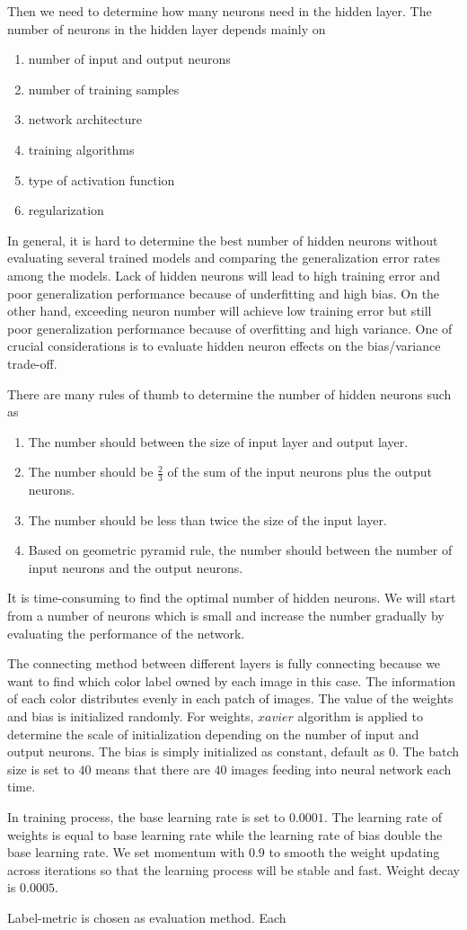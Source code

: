 Then we need to determine how many neurons need in the hidden layer. The number of neurons in the hidden layer depends mainly on
\begin{enumerate}
  \item number of input and output neurons
  \item number of training samples
  \item network architecture
  \item training algorithms
  \item type of activation function
  \item regularization
\end{enumerate}
In general, it is hard to determine the best number of hidden neurons without evaluating several trained models and comparing the generalization error rates among the models. Lack of hidden neurons will lead to high training error and poor generalization performance because of underfitting and high bias. On the other hand, exceeding neuron number will achieve low training error but still poor generalization performance because of overfitting and high variance. One of crucial considerations is to evaluate hidden neuron effects on the bias/variance trade-off.

There are many rules of thumb to determine the number of hidden neurons \citep{heaton2008introduction} such as
\begin{enumerate}
  \item The number should between the size of input layer and output layer.
  \item The number should be $\frac{2}{3}$ of the sum of the input neurons plus the output neurons.
  \item The number should be less than twice the size of the input layer.
  \item Based on geometric pyramid rule, the number should between the number of input neurons and the output neurons.
\end{enumerate}
It is time-consuming to find the optimal number of hidden neurons. We will start from a number of neurons which is small and increase the number gradually by evaluating the performance of the network.

The connecting method between different layers is fully connecting because we want to find which color label owned by each image in this case. The information of each color distributes evenly in each patch of images. The value of the weights and bias is initialized randomly. For weights, $xavier$ algorithm is applied to determine the scale of initialization depending on the number of input and output neurons. The bias is simply initialized as constant, default as $0$. The batch size is set to $40$ means that there are $40$ images feeding into neural network each time.

In training process, the base learning rate is set to $0.0001$. The learning rate of weights is equal to base learning rate while the learning rate of bias double the base learning rate. We set momentum with $0.9$ to smooth the weight updating across iterations so that the learning process will be stable and fast. Weight decay is $0.0005$.

Label-metric is chosen as evaluation method. Each 